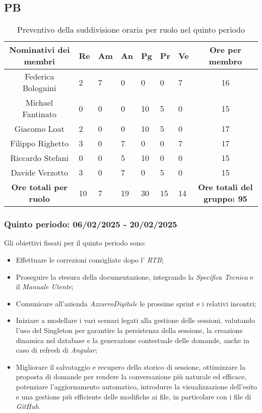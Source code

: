 \newpage
\subsection{PB}
\begin{table}[h!]
    \centering
    \renewcommand{\arraystretch}{1.5}
    \begin{tabularx}{\textwidth}{|c|X|X|X|X|X|X|c|}\hline
    \rowcolor[HTML]{FFD700} 
    \textbf{Nominativi dei membri} & \textbf{Re} & \textbf{Am} & \textbf{An} & \textbf{Pg} & \textbf{Pr} & \textbf{Ve} & \textbf{Ore per membro} \\ \hline
    Federica Bolognini  & 2 & 7 & 0 & 0 & 0 & 7 & 16 \\ \hline
    Michael Fantinato   & 0 & 0 & 0 & 10 & 5 & 0 & 15  \\ \hline
    Giacomo Loat        & 2 & 0 & 0 & 10 & 5 & 0 & 17  \\ \hline
    Filippo Righetto    & 3 & 0 & 7 & 0 & 0 & 7 & 17 \\ \hline
    Riccardo Stefani    & 0 & 0 & 5 & 10 & 0 & 0 & 15 \\ \hline
    Davide Verzotto     & 3 & 0 & 7 & 0 & 5 & 0 & 15  \\ \hline
    \rowcolor[HTML]{FFD700} 
    \textbf{Ore totali per ruolo} & 10 & 7 & 19 & 30 & 15 & 14 & \textbf{Ore totali del gruppo: 95} \\ \hline
    \end{tabularx}
    \caption{Preventivo della suddivisione oraria per ruolo nel quinto periodo}
\end{table}

\subsubsection{Quinto periodo: 06/02/2025 - 20/02/2025}
\label{sec:prev_cons_quinto_periodo}  
Gli obiettivi fissati per il quinto periodo sono:
\begin{itemize}
    \item Effettuare le correzioni consigliate dopo l' \emph{RTB};
    \item Proseguire la stesura della documentazione, integrando la \emph{Specifica Tecnica} e il \emph{Manuale Utente};
    \item Comunicare all'azienda \emph{AzzurroDigitale} le prossime sprint e i relativi incontri;
    \item Iniziare a modellare i vari scenari legati alla gestione delle sessioni, valutando l’uso del Singleton per garantire la persistenza della sessione, la creazione dinamica nel database e la generazione contestuale delle domande, anche in caso di refresh di \emph{Angular};
    \item Migliorare il salvataggio e recupero dello storico di sessione, ottimizzare la proposta di domande per rendere la conversazione più naturale ed efficace, potenziare l’aggiornamento automatico, introdurre la visualizzazione dell’esito e una gestione più efficiente delle modifiche ai file, in particolare con i file di \emph{GitHub}.
\end{itemize}

